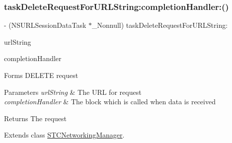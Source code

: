 \subsubsection{\texorpdfstring{task\+Delete\+Request\+For\+U\+R\+L\+String\+:completion\+Handler\+:()}{taskDeleteRequestForURLString:completionHandler:()}}
{\footnotesize\ttfamily -\/ (N\+S\+U\+R\+L\+Session\+Data\+Task $\ast$\+\_\+\+Nonnull) task\+Delete\+Request\+For\+U\+R\+L\+String\+: \begin{DoxyParamCaption}\item[{(N\+S\+String $\ast$\+\_\+\+Nonnull)}]{url\+String }\item[{completionHandler:(void($^\wedge$)(N\+S\+Data $\ast$\+\_\+\+\_\+nullable data, N\+S\+U\+R\+L\+Response $\ast$\+\_\+\+\_\+nullable response, N\+S\+Error $\ast$\+\_\+\+\_\+nullable error))}]{completion\+Handler }\end{DoxyParamCaption}}

Forms D\+E\+L\+E\+TE request


\begin{DoxyParams}{Parameters}
{\em url\+String} & The U\+RL for request \\
\hline
{\em completion\+Handler} & The block which is called when data is received \\
\hline
\end{DoxyParams}
\begin{DoxyReturn}{Returns}
The request 
\end{DoxyReturn}


Extends class \hyperlink{interface_s_t_c_networking_manager_a7cf3e2d4e1f5b8a1414c392b43ee63bd}{S\+T\+C\+Networking\+Manager}.

\hypertarget{category_s_t_c_networking_manager_07_requests_08_a46b2c22ca530b473fe9b6e4a5cdb5d7f}{}\label{category_s_t_c_networking_manager_07_requests_08_a46b2c22ca530b473fe9b6e4a5cdb5d7f} 
